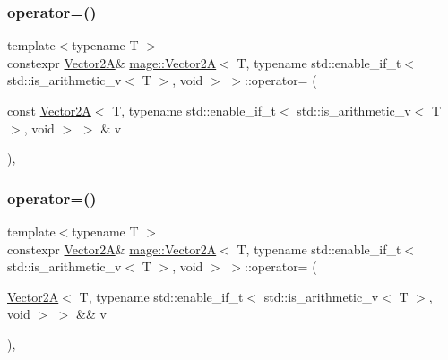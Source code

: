 \subsubsection{\texorpdfstring{operator=()}{operator=()}\hspace{0.1cm}{\footnotesize\ttfamily [1/2]}}
{\footnotesize\ttfamily template$<$typename T $>$ \\
constexpr \hyperlink{structmage_1_1_vector2_a}{Vector2A}\& \hyperlink{structmage_1_1_vector2_a}{mage\+::\+Vector2A}$<$ T, typename std\+::enable\+\_\+if\+\_\+t$<$ std\+::is\+\_\+arithmetic\+\_\+v$<$ T $>$, void $>$ $>$\+::operator= (\begin{DoxyParamCaption}\item[{const \hyperlink{structmage_1_1_vector2_a}{Vector2A}$<$ T, typename std\+::enable\+\_\+if\+\_\+t$<$ std\+::is\+\_\+arithmetic\+\_\+v$<$ T $>$, void $>$ $>$ \&}]{v }\end{DoxyParamCaption})\hspace{0.3cm}{\ttfamily [default]}, {\ttfamily [noexcept]}}

\hypertarget{structmage_1_1_vector2_a_3_01_t_00_01typename_01std_1_1enable__if__t_3_01std_1_1is__arithmetic__b421e7a25afc1ac5972d3b452777021a_a10d9c3d2ec3e045a69f4dbb761685e2a}{}\label{structmage_1_1_vector2_a_3_01_t_00_01typename_01std_1_1enable__if__t_3_01std_1_1is__arithmetic__b421e7a25afc1ac5972d3b452777021a_a10d9c3d2ec3e045a69f4dbb761685e2a} 
\subsubsection{\texorpdfstring{operator=()}{operator=()}\hspace{0.1cm}{\footnotesize\ttfamily [2/2]}}
{\footnotesize\ttfamily template$<$typename T $>$ \\
constexpr \hyperlink{structmage_1_1_vector2_a}{Vector2A}\& \hyperlink{structmage_1_1_vector2_a}{mage\+::\+Vector2A}$<$ T, typename std\+::enable\+\_\+if\+\_\+t$<$ std\+::is\+\_\+arithmetic\+\_\+v$<$ T $>$, void $>$ $>$\+::operator= (\begin{DoxyParamCaption}\item[{\hyperlink{structmage_1_1_vector2_a}{Vector2A}$<$ T, typename std\+::enable\+\_\+if\+\_\+t$<$ std\+::is\+\_\+arithmetic\+\_\+v$<$ T $>$, void $>$ $>$ \&\&}]{v }\end{DoxyParamCaption})\hspace{0.3cm}{\ttfamily [default]}, {\ttfamily [noexcept]}}

